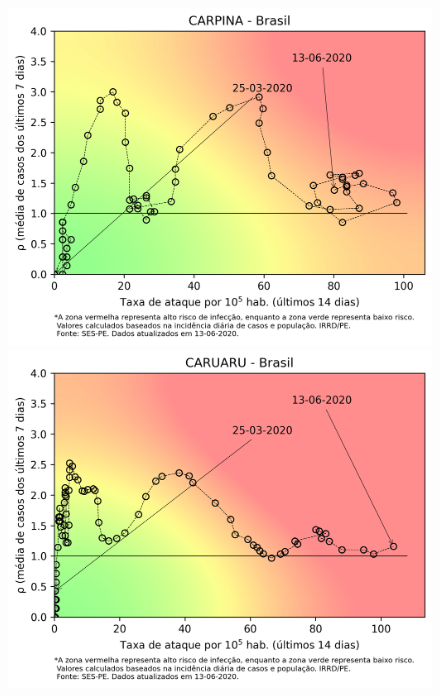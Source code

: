 \documentclass[]{article}
\begin{document}
\begin{figure}[!h]
	\centering
	\begin{minipage}[t]{4cm}
	\centering
	\includegraphics[scale=0.5]{../CARPINA.png}
\end{minipage}
\hspace{5cm}
\begin{minipage}[t]{4cm}
	\centering
	\includegraphics[scale=0.5]{../CARUARU.png}
	\vspace{0.2cm}
\end{minipage}


\end{figure}
\end{document}
